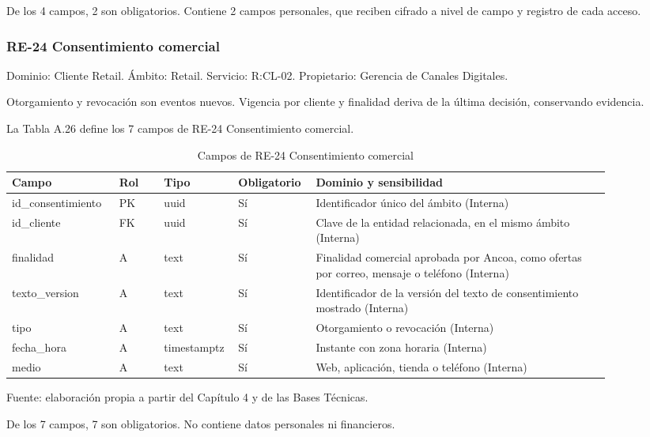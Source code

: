 \documentclass[11pt]{article}
\begin{document}
De los 4 campos, 2 son obligatorios. Contiene 2 campos personales, que reciben cifrado a nivel de campo y registro de cada acceso.

\subsubsection{RE-24 Consentimiento comercial}

Dominio: Cliente Retail. Ámbito: Retail. Servicio: R:CL-02. Propietario: Gerencia de Canales Digitales.

Otorgamiento y revocación son eventos nuevos. Vigencia por cliente y finalidad deriva de la última decisión, conservando evidencia.

La Tabla A.26 define los 7 campos de RE-24 Consentimiento comercial.

\clearpage

\begin{table}[htbp]
\caption{Campos de RE-24 Consentimiento comercial}\label{tab:d_re24}
\centering
\begin{tabular}{@{}p{0.167\linewidth}p{0.070\linewidth}p{0.079\linewidth}p{0.097\linewidth}p{0.465\linewidth}@{}}
\toprule Campo & Rol & Tipo & Obligatorio & Dominio y sensibilidad \\
\midrule
id\_consentimiento & PK & uuid & Sí & Identificador único del ámbito (Interna) \\
id\_cliente & FK & uuid & Sí & Clave de la entidad relacionada, en el mismo ámbito (Interna) \\
finalidad & A & text & Sí & Finalidad comercial aprobada por Ancoa, como ofertas por correo, mensaje o teléfono (Interna) \\
texto\_version & A & text & Sí & Identificador de la versión del texto de consentimiento mostrado (Interna) \\
tipo & A & text & Sí & Otorgamiento o revocación (Interna) \\
fecha\_hora & A & timestamptz & Sí & Instante con zona horaria (Interna) \\
medio & A & text & Sí & Web, aplicación, tienda o teléfono (Interna) \\
\bottomrule
\end{tabular}
\par\smallskip
{\raggedright Fuente: elaboración propia a partir del Capítulo 4 y de las Bases Técnicas.\par}
\end{table}


De los 7 campos, 7 son obligatorios. No contiene datos personales ni financieros.
\end{document}
